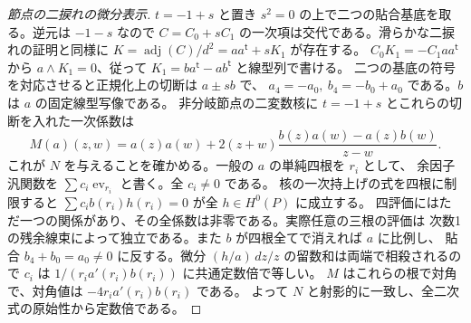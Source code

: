 \begin{proof}[節点の二捩れの微分表示]
$t=-1+s$ と置き $s^2=0$ の上で二つの貼合基底を取る。逆元は $-1-s$ なので
$C=C_0+sC_1$ の一次項は交代である。滑らかな二捩れの証明と同様に
$K=\operatorname{adj}(C)/d^2=aa^{\mathsf t}+sK_1$ が存在する。
$C_0 K_1=-C_1 aa^{\mathsf t}$ から $a\wedge K_1=0$、従って
$K_1=ba^{\mathsf t}-ab^{\mathsf t}$ と線型列で書ける。
二つの基底の符号を対応させると正規化上の切断は $a\pm s b$ で、
$a_4=-a_0,\ b_4=-b_0+a_0$ である。$b$ は $a$ の固定線型写像である。
非分岐節点の二変数核に $t=-1+s$ とこれらの切断を入れた一次係数は
\[
 M(a)(z,w)=a(z)a(w)+2(z+w)\frac{b(z)a(w)-a(z)b(w)}{z-w} .
\]
これが $N$ を与えることを確かめる。一般の $a$ の単純四根を $r_i$ として、
余因子汎関数を $\sum c_i\operatorname{ev}_{r_i}$ と書く。全 $c_i\ne0$ である。
核の一次持上げの式を四根に制限すると $\sum c_i b(r_i)h(r_i)=0$ が全 $h\in H^0(P)$ に成立する。
四評価にはただ一つの関係があり、その全係数は非零である。実際任意の三根の評価は
次数1の残余線束によって独立である。また $b$ が四根全てで消えれば $a$ に比例し、
貼合 $b_4+b_0=a_0\ne0$ に反する。微分 $(h/a)\,dz/z$ の留数和は両端で相殺されるので
$c_i$ は $1/(r_i a'(r_i)b(r_i))$ に共通定数倍で等しい。
$M$ はこれらの根で対角で、対角値は $-4r_i a'(r_i)b(r_i)$ である。
よって $N$ と射影的に一致し、全二次式の原始性から定数倍である。
\end{proof}

